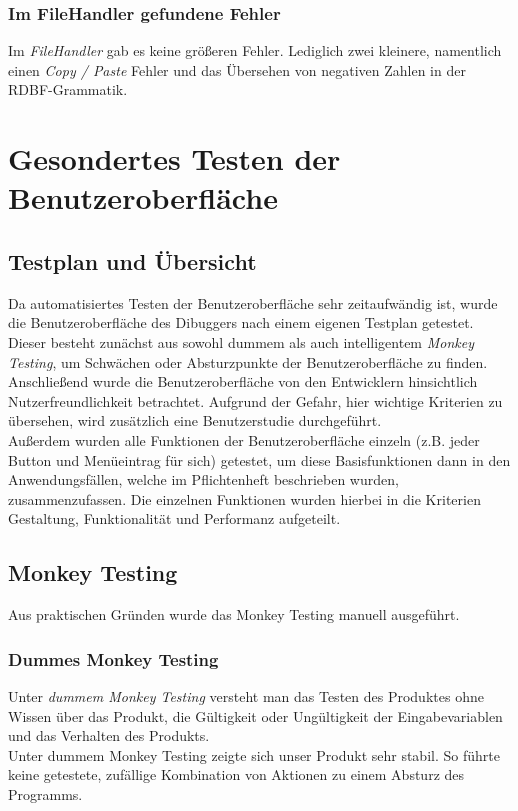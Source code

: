 \documentclass[parskip=full]{scrartcl}
\begin{document}
\subsubsection{Im FileHandler gefundene Fehler}
Im \textit{FileHandler} gab es keine größeren Fehler. Lediglich zwei kleinere, namentlich einen \textit{Copy / Paste} Fehler und das Übersehen von negativen Zahlen in der RDBF-Grammatik.

\newpage
\section{Gesondertes Testen der Benutzeroberfläche}\label{gui}

\subsection{Testplan und Übersicht}
Da automatisiertes Testen der Benutzeroberfläche sehr zeitaufwändig ist, wurde die Benutzeroberfläche des Dibuggers nach einem eigenen Testplan getestet. Dieser besteht zunächst aus sowohl dummem als auch intelligentem \textit{Monkey Testing}, um Schwächen oder Absturzpunkte der Benutzeroberfläche zu finden. \\
Anschließend wurde die Benutzeroberfläche von den Entwicklern hinsichtlich Nutzerfreundlichkeit betrachtet. Aufgrund der Gefahr, hier wichtige Kriterien zu übersehen, wird zusätzlich eine Benutzerstudie durchgeführt. \\
Außerdem wurden alle Funktionen der Benutzeroberfläche einzeln (z.B. jeder Button und Menüeintrag für sich) getestet, um diese Basisfunktionen dann in den Anwendungsfällen, welche im Pflichtenheft beschrieben wurden, zusammenzufassen. Die einzelnen Funktionen wurden hierbei in die Kriterien Gestaltung, Funktionalität und Performanz aufgeteilt.


\subsection{Monkey Testing}
Aus praktischen Gründen wurde das Monkey Testing manuell ausgeführt.
\subsubsection{Dummes Monkey Testing}
Unter \textit{dummem Monkey Testing} versteht man das Testen des Produktes ohne Wissen über das Produkt, die Gültigkeit oder Ungültigkeit der Eingabevariablen und  das Verhalten des Produkts. \\
Unter dummem Monkey Testing zeigte sich unser Produkt sehr stabil. So führte keine getestete, zufällige Kombination von Aktionen zu einem Absturz des Programms. 
\end{document}
